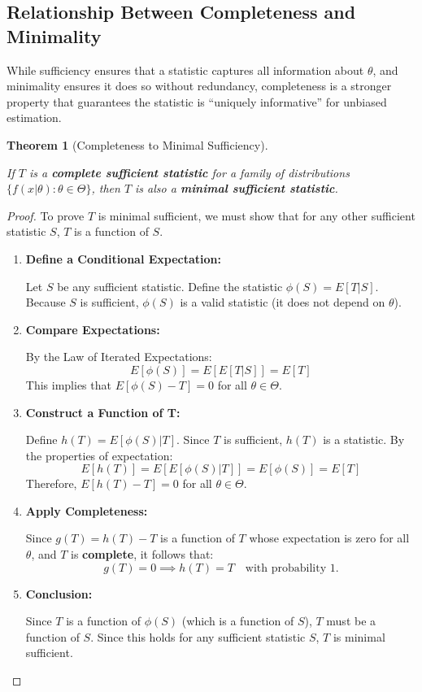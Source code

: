 \documentclass[
  letterpaper,
  DIV=11,
  numbers=noendperiod]{scrreprt}
\renewcommand{\[}{\begin{equation}}
\renewcommand{\]}{\end{equation}}
\theoremstyle{definition}
\theoremstyle{plain}
\theoremstyle{plain}
\theoremstyle{plain}
\newtheorem{theorem}{Theorem}[chapter]
\theoremstyle{definition}
\theoremstyle{plain}
\theoremstyle{remark}
\begin{document}
\subsection{Relationship Between Completeness and
Minimality}\label{relationship-between-completeness-and-minimality}

While sufficiency ensures that a statistic captures all information
about \(\theta\), and minimality ensures it does so without redundancy,
completeness is a stronger property that guarantees the statistic is
``uniquely informative'' for unbiased estimation.

\begin{theorem}[Completeness to Minimal
Sufficiency]\protect\hypertarget{thm-complete-minimal}{}\label{thm-complete-minimal}

If \(T\) is a \textbf{complete sufficient statistic} for a family of
distributions \(\{f(x|\theta) : \theta \in \Theta\}\), then \(T\) is
also a \textbf{minimal sufficient statistic}.

\end{theorem}

\begin{proof}
To prove \(T\) is minimal sufficient, we must show that for any other
sufficient statistic \(S\), \(T\) is a function of \(S\).

\begin{enumerate}
\def\labelenumi{\arabic{enumi}.}
\item
  \textbf{Define a Conditional Expectation:}

  Let \(S\) be any sufficient statistic. Define the statistic
  \(\phi(S) = E[T|S]\). Because \(S\) is sufficient, \(\phi(S)\) is a
  valid statistic (it does not depend on \(\theta\)).
\item
  \textbf{Compare Expectations:}

  By the Law of Iterated Expectations: \[E[\phi(S)] = E[E[T|S]] = E[T]\]
  This implies that \(E[\phi(S) - T] = 0\) for all
  \(\theta \in \Theta\).
\item
  \textbf{Construct a Function of T:}

  Define \(h(T) = E[\phi(S)|T]\). Since \(T\) is sufficient, \(h(T)\) is
  a statistic. By the properties of expectation:
  \[E[h(T)] = E[E[\phi(S)|T]] = E[\phi(S)] = E[T]\] Therefore,
  \(E[h(T) - T] = 0\) for all \(\theta \in \Theta\).
\item
  \textbf{Apply Completeness:}

  Since \(g(T) = h(T) - T\) is a function of \(T\) whose expectation is
  zero for all \(\theta\), and \(T\) is \textbf{complete}, it follows
  that: \[g(T) = 0 \implies h(T) = T \quad \text{with probability 1.}\]
\item
  \textbf{Conclusion:}

  Since \(T\) is a function of \(\phi(S)\) (which is a function of
  \(S\)), \(T\) must be a function of \(S\). Since this holds for any
  sufficient statistic \(S\), \(T\) is minimal sufficient.
\end{enumerate}

\end{proof}
\end{document}
